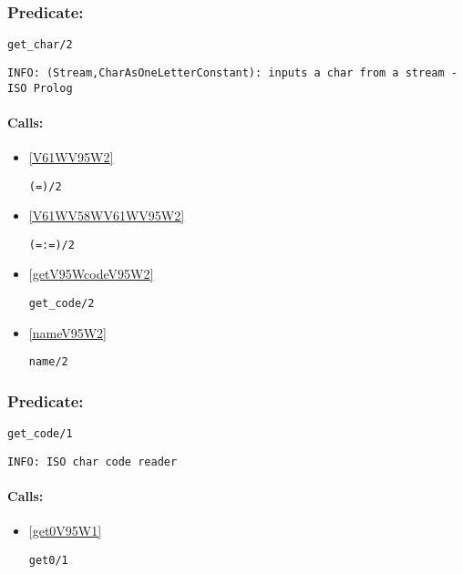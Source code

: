 \subsubsection{Predicate:} \label{getV95WcharV95W2}

\begin{verbatim}
get_char/2
\end{verbatim}

{\small \begin{verbatim}
INFO: (Stream,CharAsOneLetterConstant): inputs a char from a stream -ISO Prolog

\end{verbatim}}
\paragraph{Calls:} 
\begin{itemize}
\item \ref{V61WV95W2} 
\begin{verbatim}
(=)/2
\end{verbatim}

\item \ref{V61WV58WV61WV95W2} 
\begin{verbatim}
(=:=)/2
\end{verbatim}

\item \ref{getV95WcodeV95W2} 
\begin{verbatim}
get_code/2
\end{verbatim}

\item \ref{nameV95W2} 
\begin{verbatim}
name/2
\end{verbatim}

\end{itemize}

\subsubsection{Predicate:} \label{getV95WcodeV95W1}

\begin{verbatim}
get_code/1
\end{verbatim}

{\small \begin{verbatim}
INFO: ISO char code reader

\end{verbatim}}
\paragraph{Calls:} 
\begin{itemize}
\item \ref{get0V95W1} 
\begin{verbatim}
get0/1
\end{verbatim}

\end{itemize}

